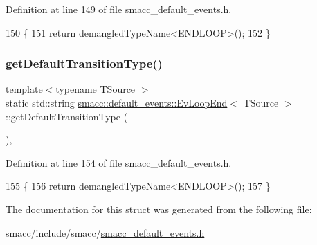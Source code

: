Definition at line 149 of file smacc\+\_\+default\+\_\+events.\+h.


\begin{DoxyCode}
150   \{
151     \textcolor{keywordflow}{return} demangledTypeName<ENDLOOP>();
152   \}
\end{DoxyCode}
\mbox{\label{structsmacc_1_1default__events_1_1EvLoopEnd_a9e05a6de331e6926fdcaa1ef13a6bd3c}} 
\subsubsection{\texorpdfstring{get\+Default\+Transition\+Type()}{getDefaultTransitionType()}}
{\footnotesize\ttfamily template$<$typename T\+Source $>$ \\
static std\+::string \hyperlink{structsmacc_1_1default__events_1_1EvLoopEnd}{smacc\+::default\+\_\+events\+::\+Ev\+Loop\+End}$<$ T\+Source $>$\+::get\+Default\+Transition\+Type (\begin{DoxyParamCaption}{ }\end{DoxyParamCaption})\hspace{0.3cm}{\ttfamily [inline]}, {\ttfamily [static]}}



Definition at line 154 of file smacc\+\_\+default\+\_\+events.\+h.


\begin{DoxyCode}
155   \{
156     \textcolor{keywordflow}{return} demangledTypeName<ENDLOOP>();
157   \}
\end{DoxyCode}


The documentation for this struct was generated from the following file\+:\begin{DoxyCompactItemize}
\item 
smacc/include/smacc/\hyperlink{smacc__default__events_8h}{smacc\+\_\+default\+\_\+events.\+h}\end{DoxyCompactItemize}
